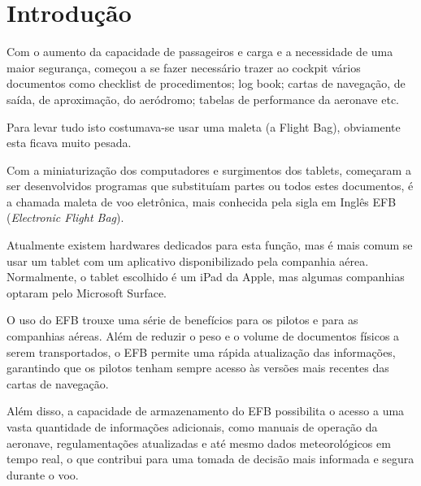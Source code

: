 \chapter{Introdução}
Com o aumento da capacidade de passageiros e carga e a necessidade 
de uma maior segurança, começou a se fazer necessário trazer ao cockpit 
vários documentos como checklist de procedimentos; log book; cartas de 
navegação, de saída, de aproximação, do aeródromo; tabelas de performance
 da aeronave etc.

Para levar tudo isto costumava-se usar uma maleta (a Flight Bag), 
obviamente esta ficava muito pesada.

Com a miniaturização dos computadores e surgimentos dos tablets, 
começaram a ser desenvolvidos programas que substituíam partes ou 
todos estes documentos, é a chamada maleta de voo eletrônica, mais 
conhecida pela sigla em Inglês EFB (\textit{Electronic Flight Bag}).

Atualmente existem hardwares dedicados para esta função, mas é mais 
comum se usar um tablet com um aplicativo disponibilizado pela companhia aérea.
Normalmente, o tablet escolhido é um iPad da Apple, mas algumas companhias
optaram pelo Microsoft Surface. \cite{surface}

O uso do EFB trouxe uma série de benefícios para os pilotos e para as 
companhias aéreas. Além de reduzir o peso e o volume de documentos físicos 
a serem transportados, o EFB permite uma rápida atualização das informações, 
garantindo que os pilotos tenham sempre acesso às versões mais recentes das 
cartas de navegação. \cite{EFB-more-than}

Além disso, a capacidade de armazenamento do EFB possibilita o acesso a uma 
vasta quantidade de informações adicionais, como manuais de operação da aeronave, 
regulamentações atualizadas e até mesmo dados meteorológicos em tempo real, 
o que contribui para uma tomada de decisão mais informada e segura durante o voo.
